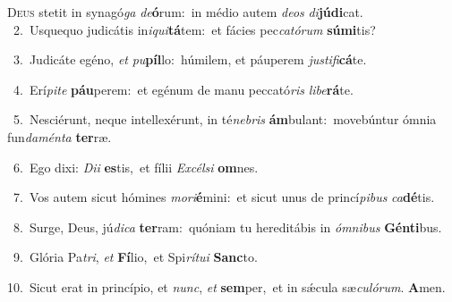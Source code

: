 \lettrine{\initial\textcolor{\initialcolor}{D}}{eus} stetit in synagó\textit{ga} \textit{de}\-\textbf{ó}rum:~\star in médio autem \textit{de}\-\textit{os} \textit{di}\-\textbf{jú}\textbf{di}cat.\\
{\numbfont\textcolor{\numbcolor}{~2.}}~Usquequo judicátis in\-\textit{i}\-\textit{qui}\textbf{tá}tem:~\star et fácies pec\-\textit{ca}\-\textit{tó}\textit{rum} \textbf{sú}\-\textbf{mi}tis?\par
{\numbfont\textcolor{\numbcolor}{~3.}}~Judicáte egéno, \textit{et} \textit{pu}\-\textbf{píl}lo:~\star húmilem, et páuperem \textit{jus}\-\textit{ti}\textit{fi}\textbf{cá}te.\par
{\numbfont\textcolor{\numbcolor}{~4.}}~Erí\-\textit{pi}\-\textit{te} \textbf{páu}\-perem:~\star et egénum de manu peccató\textit{ris} \textit{li}\-\textit{be}\textbf{rá}te.\par
{\numbfont\textcolor{\numbcolor}{~5.}}~Nesciérunt, neque intellexérunt, in té\-\textit{ne}\-\textit{bris} \textbf{ám}\-bulant:~\star movebúntur ómnia fun\-\textit{da}\-\textit{mén}\textit{ta} \textbf{ter}\-ræ.\par
{\numbfont\textcolor{\numbcolor}{~6.}}~Ego dixi: \textit{Di}\-\textit{i} \textbf{es}\-tis,~\star et fílii \textit{Ex}\-\textit{cél}\textit{si} \textbf{om}\-nes.\par
{\numbfont\textcolor{\numbcolor}{~7.}}~Vos autem sicut hómines \textit{mo}\-\textit{ri}\textbf{é}mini:~\star et sicut unus de princí\-\textit{pi}\-\textit{bus} \textit{ca}\-\textbf{dé}tis.\par
{\numbfont\textcolor{\numbcolor}{~8.}}~Surge, Deus, jú\-\textit{di}\-\textit{ca} \textbf{ter}\-ram:~\star quóniam tu hereditábis in \textit{óm}\-\textit{ni}\textit{bus} \textbf{Gén}\-\textbf{ti}bus.\par
{\numbfont\textcolor{\numbcolor}{~9.}}~Glória Pa\-\textit{tri}\-, \textit{et} \textbf{Fí}\-lio,~\star et Spi\-\textit{rí}\-\textit{tu}\textit{i} \textbf{Sanc}\-to.\par
{\numbfont\textcolor{\numbcolor}{10.}}~Sicut erat in princípio, et \textit{nunc}\-, \textit{et} \textbf{sem}\-per,~\star et in sǽcula sæ\-\textit{cu}\-\textit{ló}\textit{rum}. \textbf{A}\-men.\par
